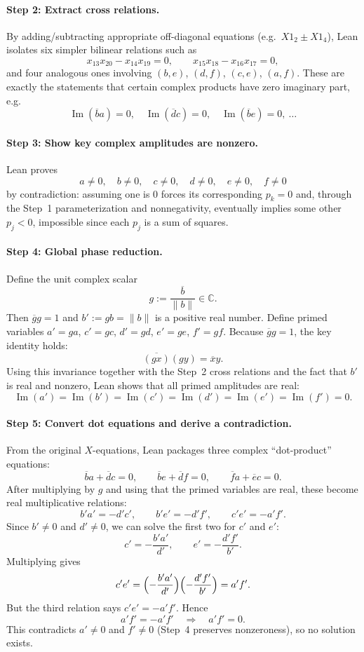 \documentclass[11pt]{article}
\begin{document}
\paragraph{Step 2: Extract cross relations.}
By adding/subtracting appropriate off-diagonal equations (e.g.\ $X1_2\pm X1_4$), Lean isolates six simpler bilinear relations such as
\[
x_{13}x_{20}-x_{14}x_{19}=0,\qquad
x_{15}x_{18}-x_{16}x_{17}=0,
\]
and four analogous ones involving $(b,e)$, $(d,f)$, $(c,e)$, $(a,f)$.
These are exactly the statements that certain complex products have zero imaginary part, e.g.
\[
\operatorname{Im}(\overline{b}a)=0,\quad \operatorname{Im}(\overline{d}c)=0,\quad \operatorname{Im}(\overline{b}e)=0,\ \dots
\]

\paragraph{Step 3: Show key complex amplitudes are nonzero.}
Lean proves
\[
a\neq 0,\quad b\neq 0,\quad c\neq 0,\quad d\neq 0,\quad e\neq 0,\quad f\neq 0
\]
by contradiction: assuming one is $0$ forces its corresponding $p_k=0$ and, through the Step~1 parameterization and nonnegativity, eventually implies some other $p_j<0$, impossible since each $p_j$ is a sum of squares.

\paragraph{Step 4: Global phase reduction.}
Define the unit complex scalar
\[
g := \frac{\overline{b}}{\lVert b\rVert}\in\mathbb{C}.
\]
Then $\overline{g}g=1$ and $b':=gb=\lVert b\rVert$ is a positive real number.
Define primed variables $a'=ga$, $c'=gc$, $d'=gd$, $e'=ge$, $f'=gf$.
Because $\overline{g}g=1$, the key identity holds:
\[
\overline{(g x)}(g y)=\overline{x}y.
\]
Using this invariance together with the Step~2 cross relations and the fact that $b'$ is real and nonzero, Lean shows that all primed amplitudes are real:
\[
\operatorname{Im}(a')=\operatorname{Im}(b')=\operatorname{Im}(c')=\operatorname{Im}(d')=\operatorname{Im}(e')=\operatorname{Im}(f')=0.
\]

\paragraph{Step 5: Convert dot equations and derive a contradiction.}
From the original $X$-equations, Lean packages three complex ``dot-product'' equations:
\[
\overline{b}a+\overline{d}c=0,\qquad
\overline{b}e+\overline{d}f=0,\qquad
\overline{f}a+\overline{e}c=0.
\]
After multiplying by $g$ and using that the primed variables are real, these become real multiplicative relations:
\[
b'a'=-d'c',\qquad b'e'=-d'f',\qquad c'e'=-a'f'.
\]
Since $b'\neq 0$ and $d'\neq 0$, we can solve the first two for $c'$ and $e'$:
\[
c'=-\frac{b'a'}{d'},\qquad e'=-\frac{d'f'}{b'}.
\]
Multiplying gives
\[
c'e'=\Bigl(-\frac{b'a'}{d'}\Bigr)\Bigl(-\frac{d'f'}{b'}\Bigr)=a'f'.
\]
But the third relation says $c'e'=-a'f'$. Hence
\[
a'f'=-a'f' \quad\Rightarrow\quad a'f'=0.
\]
This contradicts $a'\neq 0$ and $f'\neq 0$ (Step~4 preserves nonzeroness), so no solution exists.
\end{document}
